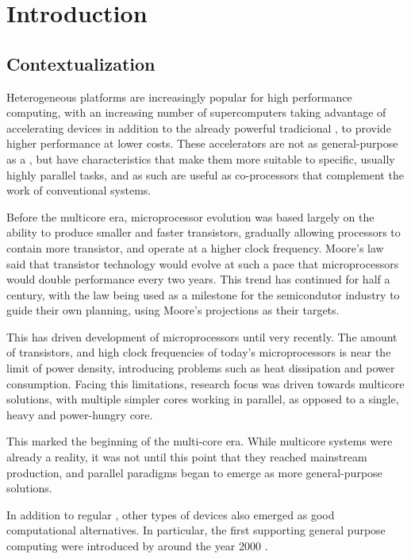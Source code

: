 \documentclass[main.tex]{subfiles}
\begin{document}
\chapter{Introduction}

\section{Contextualization}


Heterogeneous platforms are increasingly popular for high performance computing, with an increasing number of supercomputers taking advantage of accelerating devices in addition to the already powerful tradicional \cpus, to provide higher performance at lower costs. These accelerators are not as general-purpose as a \cpu, but have characteristics that make them more suitable to specific, usually highly parallel tasks, and as such are useful as co-processors that complement the work of conventional systems.

Before the multicore era, microprocessor evolution was based largely on the ability to produce smaller and faster transistors, gradually allowing processors to contain more transistor, and operate at a higher clock frequency. Moore's law \cite{moore1965cramming,moore1975progress} said that transistor technology would evolve at such a pace that microprocessors would double performance every two years. This trend has continued for half a century, with the law being used as a milestone for the semicondutor industry to guide their own planning, using Moore's projections as their targets.

This has driven development of microprocessors until very recently. The amount of transistors, and high clock frequencies of today's microprocessors is near the limit of power density, introducing problems such as heat dissipation and power consumption. Facing this limitations, research focus was driven towards multicore solutions, with multiple simpler cores working in parallel, as opposed to a single, heavy and power-hungry core.

This marked the beginning of the multi-core era. While multicore systems were already a reality, it was not until this point that they reached mainstream production, and parallel paradigms began to emerge as more general-purpose solutions.

In addition to regular \cpus, other types of devices also emerged as good computational alternatives. In particular, the first \gpus supporting general purpose computing were introduced by \nvidia around the year 2000 \cite{luebke2006gpgpu} .
\end{document}
